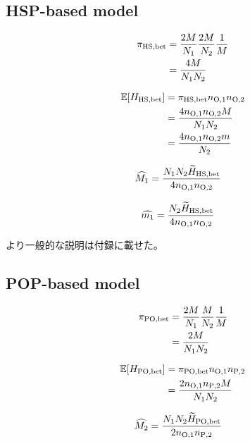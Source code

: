 \documentclass[AMA,STIX1COL]{WileyNJD-v2}
\begin{document}
\subsection{HSP-based model}

\begin{align}
\pi_{\rm HS,bet} &= \frac{2M}{N_{1}} \frac{2M}{N_{2}} \frac{1}{M} \nonumber\\
&= \frac{4M}{N_{1}N_{2}}
\label{HS-1}
\end{align}

\begin{align}
\mathbb{E}[H_{\rm HS, bet}] &= \pi_{\rm HS,bet} n_{\rm O, 1} n_{\rm O, 2} \nonumber\\
&= \frac{ 4 n_{\rm O, 1} n_{\rm O, 2} M } { N_{1} N_{2} } \\
&= \frac{ 4 n_{\rm O, 1} n_{\rm O, 2} m } { N_{2} }
\label{HS-2}
\end{align}

\begin{align}
\widehat{M_1} &= \frac{N_{1} N_{2} \widetilde{H}_{\rm HS, bet} } {4 n_{\rm O, 1} n_{\rm O, 2} }
\label{HS-3}
\end{align}

\begin{align}
\widehat{m_1} &= \frac{N_{2} \widetilde{H}_{\rm HS, bet} } {4 n_{\rm O, 1} n_{\rm O, 2} }
\label{HS-3}
\end{align}

より一般的な説明は付録に載せた。

\subsection{POP-based model}

\begin{align}
\pi_{\rm PO,bet} &= \frac{2M}{N_{1}} \frac{M}{N_{2}} \frac{1}{M} \nonumber\\
&= \frac{2M}{N_{1}N_{2}}
\label{PO-1}
\end{align}

\begin{align}
\mathbb{E}[H_{\rm PO, bet}] &= \pi_{\rm PO,bet} n_{\rm O, 1} n_{\rm P, 2} \nonumber\\
&= \frac{ 2 n_{\rm O, 1} n_{\rm P, 2} M } { N_{1} N_{2} }
\label{PO-2}
\end{align}

\begin{align}
\widehat{M_2} &= \frac{N_{1} N_{2} \widetilde{H}_{\rm PO,bet} } {2 n_{\rm O, 1} n_{\rm P, 2} }
\label{PO-3}
\end{align}
\end{document}

